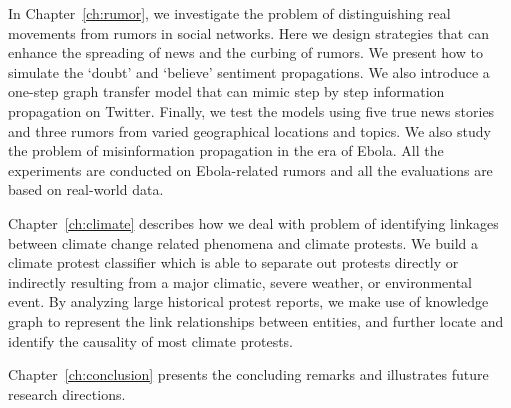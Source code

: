 In Chapter~\ref{ch:rumor}, we investigate the problem of distinguishing real movements from rumors in social networks. Here we design strategies that can enhance the spreading of news and the curbing of rumors. We present how to simulate the `doubt' and `believe' sentiment propagations. We also introduce a one-step graph transfer model that can mimic step by step information propagation on Twitter. Finally, we test the models using five true news stories and three rumors from varied geographical locations and topics. We also study the problem of misinformation propagation in the era of Ebola. All the experiments are conducted on Ebola-related rumors and all the evaluations are based on real-world data.

Chapter~\ref{ch:climate} describes how we deal with problem of identifying linkages between climate change related phenomena and climate protests. We build a climate protest classifier which is able to separate out protests directly or indirectly resulting from a major climatic, severe weather, or environmental event. By analyzing large historical protest reports, we make use of knowledge graph to represent the link relationships between entities, and further locate and identify the causality of most climate protests.

Chapter~\ref{ch:conclusion} presents the concluding remarks and illustrates future research directions.


